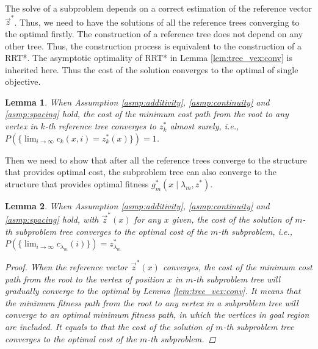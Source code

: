 \documentclass{article}
\newtheorem{lem}{Lemma}
\begin{document}
The solve of a subproblem depends on a correct estimation of the reference vector $ \vec{z}^{*} $.
Thus, we need to have the solutions of all the reference trees converging to the optimal firstly.
The construction of a reference tree does not depend on any other tree.
Thus, the construction process is equivalent to the construction of a RRT*.
The asymptotic optimality of RRT* in Lemma \ref{lem:tree_vex:conv} is inherited here.
Thus the cost of the solution converges to the optimal of single objective.
\begin{lem}
\label{lem:ref_tree:conv}
When Assumption \ref{asmp:additivity}, \ref{asmp:continuity} and \ref{asmp:spacing} hold,
the cost of the minimum cost path from the root to any vertex in $ k $-th reference tree converges to $ z^{*}_{k} $ almost surely, i.e., 
$ P( \{ \lim_{ i \rightarrow \infty }  c_{k} (x, i ) = z^{*}_{k} (x) \} ) = 1  $.
\end{lem}

Then we need to show that after all the reference trees converge to the structure that provides optimal cost, 
the subproblem tree can also converge to the structure that provides optimal fitness $ g^{*}_{m} ( x \mid \lambda_{m} , z^{*} ) $.
\begin{lem}
\label{lem:sub_tree:conv}
When Assumption \ref{asmp:additivity}, \ref{asmp:continuity} and \ref{asmp:spacing} hold,
with $ \vec{z}^{*} (x) $ for any $ x $ given,
the cost of the solution of $ m $-th subproblem tree converges to the optimal cost of the $ m $-th subproblem, i.e.,
$
P( \{ \lim_{ i \rightarrow \infty } c_{ \lambda_{m} }( i ) \} ) = z^{*}_{ \lambda_{m} }
$
\begin{proof}
When the reference vector $ \vec{z}^{*}(x) $ converges, the cost of the minimum cost path from the root to the vertex of position $ x $ in $ m $-th subproblem tree will gradually converge to the optimal by Lemma \ref{lem:tree_vex:conv}.
It means that the minimum fitness path from the root to any vertex in a subproblem tree will converge to an optimal minimum fitness path, in which the vertices in goal region are included.
It equals to that the cost of the solution of $ m $-th subproblem tree converges to the optimal cost of the $ m $-th subproblem.
\end{proof}
\end{lem}
\end{document}

